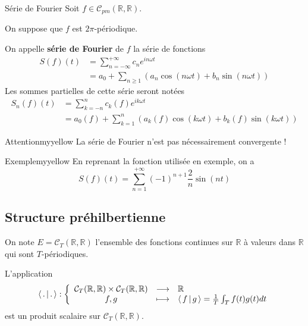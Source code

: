     \begin{defi}{Série de Fourier}{}
        Soit $f \in \mathcal{C}_{pm}(\mathbb{R},\mathbb{R})$.

        On suppose que $f$ est $2 \pi$-périodique.

        On appelle \textbf{série de Fourier} de $f$ la série de fonctions 
        \begin{align*}
           S(f)(t) &= \sum\limits_{n=-\infty}^{+\infty} c_n e^{in \omega t}  \\
           &= a_0 + \sum\limits_{n \geq 1} \left(a_n\cos(n \omega t) + b_n \sin(n \omega t)\right)
        \end{align*}
        Les sommes partielles de cette série seront notées 
        \begin{align*}
            S_n(f)(t) &= \sum\limits_{k=-n}^n c_k(f)e^{ik \omega t} \\
            &= a_0(f) + \sum\limits_{k=1}^n\left(a_k(f)\cos(k \omega t)+b_k(f)\sin(k \omega t)\right)
        \end{align*}
    \end{defi}

    \begin{omed}{Attention}{myyellow}
        La série de Fourier n’est pas nécessairement convergente !
    \end{omed}

    \begin{omed}{Exemple}{myyellow}
        En reprenant la fonction utilisée en exemple, on a 
        \[ S(f)(t) = \sum\limits_{n=1}^{+ \infty} (-1)^{n+1} \frac{2}{n} \sin(nt) \]
    \end{omed}

\subsection{Structure préhilbertienne}

    On note $E = \mathcal{C}_T (\mathbb{R},\mathbb{R})$ l’ensemble des fonctions continues sur $\mathbb{R}$ à valeurs dans $\mathbb{R}$ qui sont $T$-périodiques.

    \begin{prop}{}{}
        L’application 
        \[ \fonction{\spr{.}{.}}{\mathcal{C}_T(\mathbb{R},\mathbb{R}) \times \mathcal{C}_T(\mathbb{R},\mathbb{R})}{\mathbb{R}}{f,g}{\spr{f}{g}=\frac{1}{T}\int_{T} f(t)g(t)dt} \] 
        est un produit scalaire sur $\mathcal{C}_T(\mathbb{R},\mathbb{R})$.
    \end{prop}

